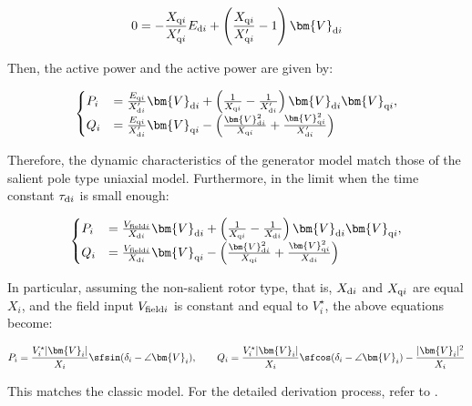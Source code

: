 \documentclass[graybox, envcountchap]{svmult}
\begin{document}
\begin{COLUMN}
\[
  0=- \frac{ X_{{\rm q}i} }{ X_{{\rm q}i}' }E_{{\rm d}i}
  +\left(
  \frac{ X_{{\rm q}i} }{ X_{{\rm q}i}' } -1
  \right)
  \bm{V}_{{\rm d}i}
\]

Then, the active power and the active power are given by:

\begin{equation*}
  \begin{aligned}
    \begin{cases}
      P_i & =  \frac{E_{{\rm q}i}}{X_{{\rm d}i}' } \bm{V}_{{\rm d}i}
      +
      \left(
      \frac{1}{X_{{\rm q}i} } - \frac{1}{X_{{\rm d}i}'} 
      \right)
      \bm{V}_{{\rm d}i} \bm{V}_{{\rm q}i}
      , \\
      Q_i & =  
      \frac{E_{{\rm q}i}}{X_{{\rm d}i}' } \bm{V}_{{\rm q}i}
      -
      \left(
      \frac{\bm{V}_{{\rm d}i}^2}{X_{{\rm q}i} } 
      +
      \frac{\bm{V}_{{\rm q}i}^2 }{X_{{\rm d}i}'} 
      \right)
    \end{cases}
  \end{aligned}
\end{equation*}

Therefore, the dynamic characteristics of the generator model match those of the
salient pole type uniaxial model. Furthermore, in the limit when the time
constant $\tau_{{\rm d}i}$ is small enough:

\begin{equation*}
  \begin{aligned}
    \begin{cases}
      P_i & =  \frac{V_{{\rm field}i}}{X_{{\rm d}i} } \bm{V}_{{\rm d}i}
      +
      \left(
      \frac{1}{X_{{\rm q}i} } - \frac{1}{X_{{\rm d}i} } 
      \right)
      \bm{V}_{{\rm d}i} \bm{V}_{{\rm q}i}
      , \\
      Q_i & =  
      \frac{V_{{\rm field}i}}{X_{{\rm d}i} } \bm{V}_{{\rm q}i}
      -
      \left(
      \frac{\bm{V}_{{\rm d}i}^2}{X_{{\rm q}i} } 
      +
      \frac{\bm{V}_{{\rm q}i}^2 }{X_{{\rm d}i} } 
      \right)
    \end{cases}
  \end{aligned}
\end{equation*}

In particular, assuming the non-salient rotor type, that is, $X_{{\rm d}i}$ and
$X_{{\rm q}i}$ are equal $X_i$, and the field input $V_{{\rm field}i}$ is
constant and equal to $V_{i}^{\star}$, the above equations become:

\[
  P_i = \frac{V_{i}^{\star} |\bm{V}_i| }{X_i } \sfsin (\delta_i - \angle \bm{V}_i ) 
  ,\qquad
  Q_i = \frac{V_{i}^{\star} |\bm{V}_i| }{X_i }  \sfcos (\delta_i - \angle \bm{V}_i ) 
  - \frac{|\bm{V}_i|^2 }{X_i }
\]

This matches the classic model. For the detailed derivation process, refer to
\cite[Section 5]{sauer2017power}.
\end{COLUMN}
\end{document}
